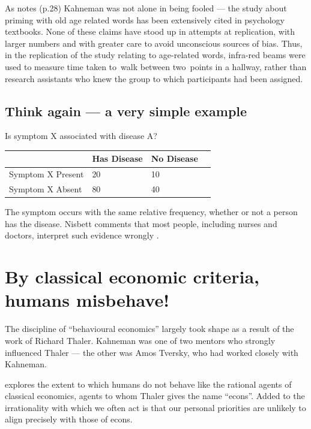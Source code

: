 \documentclass[
  10pt,
  b5paper]{book}
\begin{document}
As \citet{ritchie2020science} notes (p.28) Kahneman was not alone
in being fooled --- the study about priming with old age
related words has been extensively cited in
psychology textbooks. None of these claims have stood up
in attempts at replication, with larger numbers and with
greater care to avoid unconscious sources of bias. Thus,
in the replication of the study relating to age-related
words, infra-red beams were used to measure time taken
to~walk between two~points in a hallway, rather than
research assistants who knew the group to which
participants had been assigned.

\hypertarget{think-again-a-very-simple-example}{%
\subsection*{Think again --- a very simple example}\label{think-again-a-very-simple-example}}

Is symptom X associated with disease A?

\begin{longtable}[]{@{}llll@{}}
\toprule
& Has Disease & No Disease & \\
\midrule
\endhead
Symptom X Present & 20 & 10 & \\
Symptom X Absent & 80 & 40 & \\
\bottomrule
\end{longtable}

The symptom occurs with the same relative frequency, whether or
not a person has the disease.
Nisbett comments that most people, including nurses and doctors,
interpret such evidence wrongly \citep[pp.129-130]{nisbett}.

\hypertarget{by-classical-economic-criteria-humans-misbehave}{%
\section{By classical economic criteria, humans misbehave!}\label{by-classical-economic-criteria-humans-misbehave}}

The discipline of ``behavioural economics'' largely took shape
as a result of the work of Richard Thaler. Kahneman was
one of two mentors who strongly influenced Thaler --- the
other was Amos Tversky, who had worked closely with Kahneman.

\citet{thaler2015misbehaving} explores the extent to which humans do
not behave like the rational agents of classical economics,
agents to whom Thaler gives the name ``econs''. Added to the
irrationality with which we often act is that our personal
priorities are unlikely to align precisely with those of econs.
\end{document}
